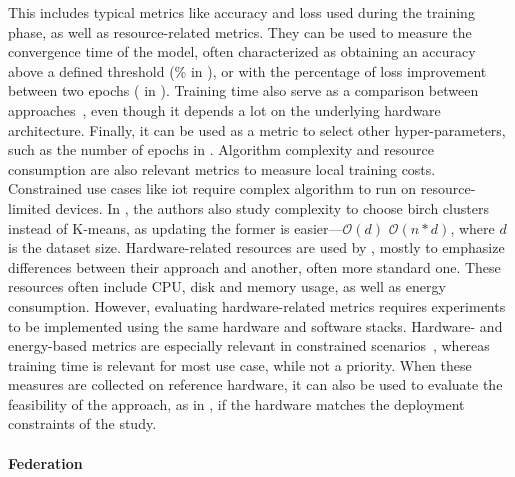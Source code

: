 This includes typical metrics like accuracy and loss used during the training phase, as well as resource-related metrics.
They can be used to measure the convergence time of the model, often characterized as obtaining an accuracy above a defined threshold (\% in \cite{chen_Networkanomalydetection_2020}), or with the percentage of loss improvement between two epochs ( in \cite{kim_CollaborativeAnomalyDetection_2020}). Training time also serve as a comparison between approaches~\cite{schneble_Attackdetectionusing_2019}, even though it depends a lot on the underlying hardware architecture. Finally, it can be used as a metric to select other hyper-parameters, such as the number of epochs in \cite{liu_BlockchainFederatedLearning_2021}.
Algorithm complexity and resource consumption are also relevant metrics to measure local training costs.
Constrained use cases like \gls{iot} require complex algorithm to run on resource-limited devices.
In \cite{pahl_AllEyesYou_2018}, the authors also study complexity to choose \gls{birch} clusters instead of K-means, as updating the former is easier---\(\mathcal{O}(d)\) \vs \(\mathcal{O}(n*d)\), where \(d\) is the dataset size.
Hardware-related resources are used by \cite{rathore_BlockSecIoTNetBlockchainbaseddecentralized_2019,zhao_MultiTaskNetworkAnomaly_2019}, mostly to emphasize differences between their approach and another, often more standard one.
These resources often include CPU, disk and memory usage, as well as energy consumption.
However, evaluating hardware-related metrics requires experiments to be implemented using the same hardware and software stacks.
Hardware- and energy-based metrics are especially relevant in constrained scenarios~\cite{nguyen_DIoTFederatedSelflearning_2019,schneble_Attackdetectionusing_2019}, whereas training time is relevant for most use case, while not a priority.
When these measures are collected on reference hardware, it can also be used to evaluate the feasibility of the approach, as in \cite{nguyen_DIoTFederatedSelflearning_2019}, if the hardware matches the deployment constraints of the study.

\paragraph{Federation}

